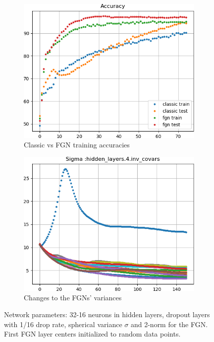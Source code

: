 \documentclass[12pt,oneside]{CUNY_PhD}
\begin{document}
\begin{figure}[!t]
    \centering
    \begin{subfigure}[t]{0.49\textwidth}
        \includegraphics[width=\textwidth]{images/2D-network-toy/training-accuracy.png}
        \caption*{Classic vs FGN training accuracies}
    \end{subfigure}
    \begin{subfigure}[t]{0.49\textwidth}
        \includegraphics[width=\textwidth]{images/2D-network-toy/sigmas-change.png}
        \caption*{Changes to the FGNs' variances}
    \end{subfigure}
    \caption{Network parameters: 32-16 neurons in hidden layers, dropout layers with 1/16 drop rate, spherical variance $\sigma$ and 2-norm for the FGN. First FGN layer centers initialized to random data points.}
    \label{fig:toy-2d-params}
\end{figure}
 
\end{document}
